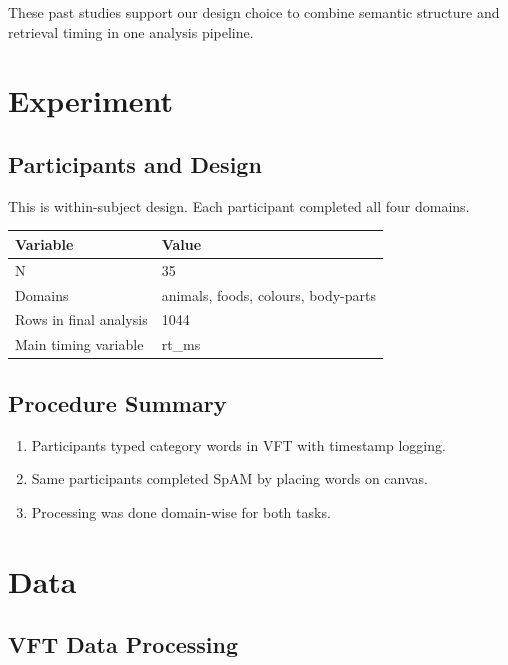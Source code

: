 These past studies support our design choice to combine semantic
structure and retrieval timing in one analysis pipeline.

\section{Experiment}\label{experiment}

\subsection{Participants and Design}\label{participants-and-design}

This is within-subject design. Each participant completed all four
domains.

{\def\LTcaptype{none} %
\begin{longtable}[]{@{}ll@{}}
\toprule\noalign{}
Variable & Value \\
\midrule\noalign{}
\endhead
\bottomrule\noalign{}
\endlastfoot
N & 35 \\
Domains & animals, foods, colours, body-parts \\
Rows in final analysis & 1044 \\
Main timing variable & rt\_ms \\
\end{longtable}
}

\subsection{Procedure Summary}\label{procedure-summary}

\begin{enumerate}
\def\labelenumi{\arabic{enumi}.}
\tightlist
\item
  Participants typed category words in VFT with timestamp logging.
\item
  Same participants completed SpAM by placing words on canvas.
\item
  Processing was done domain-wise for both tasks.
\end{enumerate}

\section{Data}\label{data}

\subsection{VFT Data Processing}\label{vft-data-processing}

